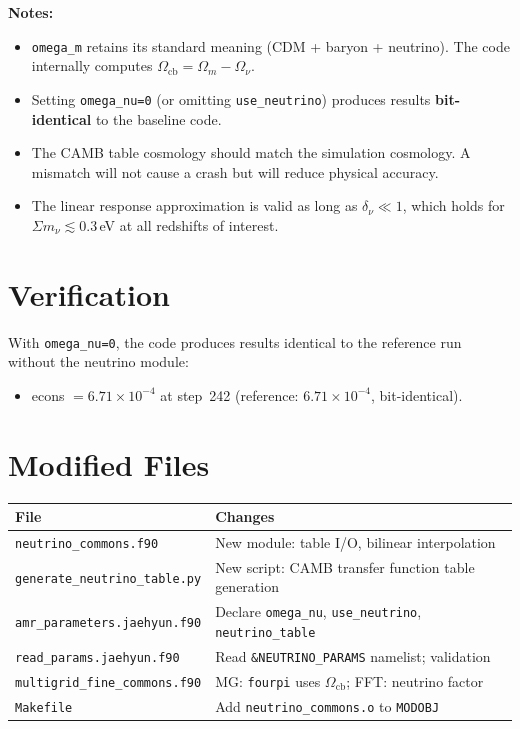 \documentclass[11pt,fleqn]{book}
\begin{document}
\noindent
\textbf{Notes:}
\begin{itemize}[nosep]
  \item \texttt{omega\_m} retains its standard meaning (CDM + baryon + neutrino).
    The code internally computes $\Omega_{\mathrm{cb}} = \Omega_m - \Omega_\nu$.
  \item Setting \texttt{omega\_nu=0} (or omitting \texttt{use\_neutrino})
    produces results \textbf{bit-identical} to the baseline code.
  \item The CAMB table cosmology should match the simulation cosmology.
    A mismatch will not cause a crash but will reduce physical accuracy.
  \item The linear response approximation is valid as long as
    $\delta_\nu \ll 1$, which holds for $\Sigma m_\nu \lesssim 0.3\,$eV
    at all redshifts of interest.
\end{itemize}

\section{Verification}

With \texttt{omega\_nu=0}, the code produces results identical to the
reference run without the neutrino module:
\begin{itemize}[nosep]
  \item econs $= 6.71 \times 10^{-4}$ at step~242
    (reference: $6.71 \times 10^{-4}$, bit-identical).
\end{itemize}

\section{Modified Files}

\begin{longtable}{L{6.5cm} L{7cm}}
\toprule
\textbf{File} & \textbf{Changes} \\
\midrule
\endhead
\texttt{neutrino\_commons.f90} & New module: table I/O, bilinear interpolation \\
\texttt{generate\_neutrino\_table.py} & New script: CAMB transfer function table generation \\
\texttt{amr\_parameters.jaehyun.f90} & Declare \texttt{omega\_nu}, \texttt{use\_neutrino}, \texttt{neutrino\_table} \\
\texttt{read\_params.jaehyun.f90} & Read \texttt{\&NEUTRINO\_PARAMS} namelist; validation \\
\texttt{multigrid\_fine\_commons.f90} & MG: \texttt{fourpi} uses $\Omega_{\mathrm{cb}}$; FFT: neutrino factor \\
\texttt{Makefile} & Add \texttt{neutrino\_commons.o} to \texttt{MODOBJ} \\
\bottomrule
\end{longtable}
\end{document}
